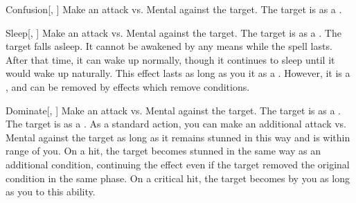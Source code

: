 \lowercase{\hypertarget{spell:Confusion}{}}\label{spell:Confusion}
\begin{freeability}[\nth{3}]{\hypertarget{spell:Confusion}{Confusion}}[, ]
Make an attack vs. Mental against the target.
\hit The target is \confused as a .
\end{freeability}
\vspace{0.25em}



\lowercase{\hypertarget{spell:Sleep}{}}\label{spell:Sleep}
\begin{freeability}[\nth{3}]{\hypertarget{spell:Sleep}{Sleep}}[, ]
Make an attack vs. Mental against the target.
\hit The target is \blinded as a .
\crit The target falls asleep.
It cannot be awakened by any means while the spell lasts.
After that time, it can wake up normally, though it continues to sleep until it would wake up naturally.
This effect lasts as long as you  it as a .
However, it is a , and can be removed by effects which remove conditions.
\end{freeability}
\vspace{0.25em}



\lowercase{\hypertarget{spell:Dominate}{}}\label{spell:Dominate}
\begin{freeability}[\nth{4}]{\hypertarget{spell:Dominate}{Dominate}}[, ]
Make an attack vs. Mental against the target.
\hit The target is  as a .
\crit The target is  as a .
As a standard action, you can make an additional attack vs. Mental against the target as long as it remains stunned in this way and is within \rngmed range of you.
On a hit, the target becomes stunned in the same way as an additional condition, continuing the effect even if the target removed the original condition in the same phase.
On a critical hit, the target becomes  by you as long as you  to this ability.
\end{freeability}
\vspace{0.25em}




